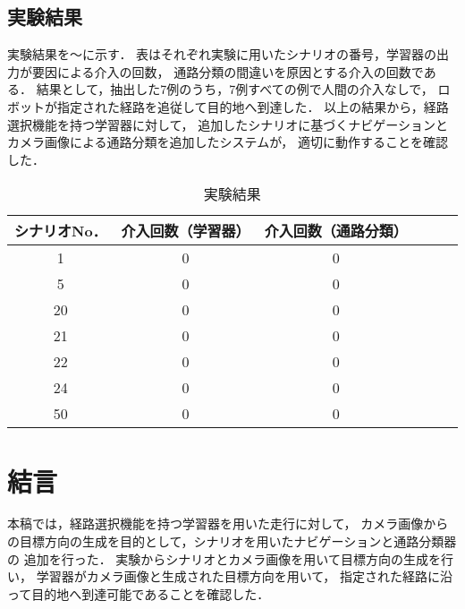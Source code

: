 \documentclass{sice-si}
\begin{document}
\subsection{実験結果}
実験結果を〜に示す．
表はそれぞれ実験に用いたシナリオの番号，学習器の出力が要因による介入の回数，
通路分類の間違いを原因とする介入の回数である．
結果として，抽出した7例のうち，7例すべての例で人間の介入なしで，
ロボットが指定された経路を追従して目的地へ到達した．
以上の結果から，経路選択機能を持つ学習器に対して，
追加したシナリオに基づくナビゲーションとカメラ画像による通路分類を追加したシステムが，
適切に動作することを確認した．
\begin{table}[]
    \centering
    \caption{実験結果}
    \begin{tabular}{ccclll}
    \hline
    シナリオNo． & 介入回数（学習器） & 介入回数（通路分類） \\
    \hline
    1       & 0         & 0             \\
    5       & 0         & 0             \\
    20      & 0         & 0             \\
    21      & 0         & 0             \\
    22      & 0         & 0             \\
    24      & 0         & 0             \\
    50      & 0         & 0             \\
    \hline
    \end{tabular}
    \end{table}

\section{結言}
本稿では，経路選択機能を持つ学習器を用いた走行に対して，
カメラ画像からの目標方向の生成を目的として，シナリオを用いたナビゲーションと通路分類器の
追加を行った．
実験からシナリオとカメラ画像を用いて目標方向の生成を行い，
学習器がカメラ画像と生成された目標方向を用いて，
指定された経路に沿って目的地へ到達可能であることを確認した．
\end{document}
